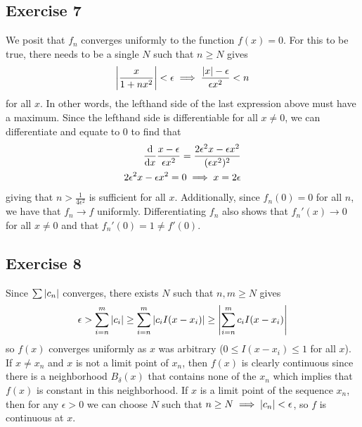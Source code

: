 \subsection{Exercise 7}
We posit that $f_n$ converges uniformly to the function $f(x) = 0$. For this to be true, there needs to be a
single $N$ such that $n \geq N$ gives
\begin{align*}
        \abs{\frac{x}{1 + nx^2}} < \epsilon \implies \frac{\abs{x} - \epsilon}{\epsilon x^2} < n
\end{align*}
for all $x$. In other words, the lefthand side of the last expression above must have a maximum. Since the 
lefthand side is differentiable for all $x \neq 0$, we can differentiate and equate to 0 to find that 
\begin{align*}
        \dv{x} \frac{x - \epsilon}{\epsilon x^2} = \frac{2\epsilon^2 x - \epsilon x^2}{(\epsilon x^2)^2} \\
        2\epsilon^2 x - \epsilon x^2 = 0 \implies x = 2 \epsilon
\end{align*}
giving that $n > \frac{1}{4\epsilon^2}$ is sufficient for all $x$. Additionally, since $f_n(0) = 0$ for all
$n$, we have that $f_n \to f$ uniformly. Differentiating $f_n$ also shows that $f_n'(x) \to 0$ for all
$x \neq 0$ and that $f_n'(0) = 1 \neq f'(0)$.

\subsection{Exercise 8}
Since $\sum \abs{c_n}$ converges, there exists $N$ such that $n, m \geq N$ gives
\begin{align*}
        \epsilon > \sum_{i = n}^m \abs{c_i} \geq \sum_{i = n}^m \abs{c_i I(x - x_i)} \geq \abs{\sum_{i = n}^m c_i I(x - x_i)}
\end{align*}
so $f(x)$ converges uniformly as $x$ was arbitrary ($0 \leq I(x - x_i) \leq 1$ for all $x$). If $x \neq x_n$ 
and $x$ is not a limit point of $x_n$, then $f(x)$ is clearly continuous since there is a neighborhood
$B_{\delta}(x)$ that contains none of the $x_n$ which implies that $f(x)$ is constant in this neighborhood.
If $x$ is a limit point of the sequence $x_n$, then for any $\epsilon > 0$ we can choose $N$ such that
$n \geq N \implies \abs{c_n} < \epsilon$, so $f $ is continuous at $x$. 

